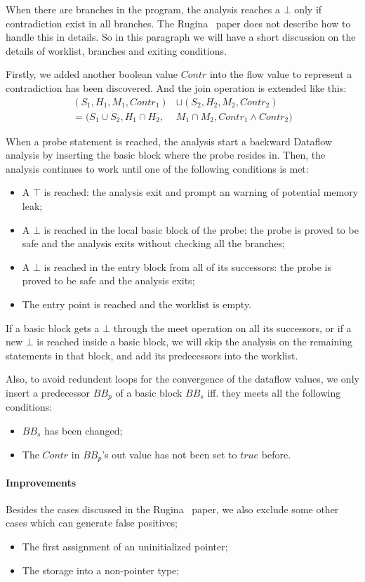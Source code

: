 When there are branches in the program, the analysis reaches a $\bot$ only if 
contradiction exist in all branches. The Rugina~\cite{rugina} paper does not 
describe how to handle this in details. So in this paragraph we will have a 
short discussion on the details of worklist, branches and exiting conditions.

Firstly, we added another boolean value $Contr$ into the flow value to 
represent a contradiction has been discovered. And the join operation is 
extended like this:
\begin{align*}
  (S_1,H_1,M_1,Contr_1) &\sqcup (S_2,H_2,M_2,Contr_2) \\
  = (S_1\cup S_2,H_1\cap H_2, & M_1\cap M_2,Contr_1\wedge Contr_2)
\end{align*}

When a probe statement is reached, the analysis start a backward Dataflow 
analysis by inserting the basic block where 
the probe resides in. Then, the analysis continues to work until one of the 
following conditions is met:
\begin{itemize}
  \item A $\top$ is reached: the analysis exit and prompt an warning of 
    potential memory leak;
  \item A $\bot$ is reached in the local basic block of the probe: 
    the probe is proved to be safe and the analysis exits without checking all 
    the branches;
  \item A $\bot$ is reached in the entry block from all of its successors:
    the probe is proved to be safe and the analysis exits;
  \item The entry point is reached and the worklist is empty.
\end{itemize}

If a basic block gets a $\bot$ through the meet operation on all its successors,
or if a new $\bot$ is reached inside a basic block, we will skip the analysis on 
the remaining statements in that block, and add its predecessors into the 
worklist.

Also, to avoid redundent loops for the convergence of the dataflow values, 
we only insert a predecessor $BB_p$ of a basic block $BB_s$ iff. they meets 
all the following conditions:
\begin{itemize}
  \item $BB_s$ has been changed;
  \item The $Contr$ in $BB_p$'s out value has not been set to $true$ before.
\end{itemize}


\paragraph{Improvements}

Besides the cases discussed in the Rugina~\cite{rugina} paper, we also exclude 
some other cases which can generate false positives;

\begin{itemize}
  \item The first assignment of an uninitialized pointer;
  \item The storage into a non-pointer type;
\end{itemize}
